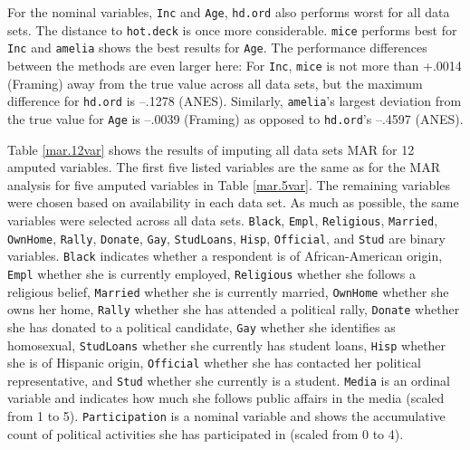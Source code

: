 \documentclass[12pt,econ]{sources/authesis}
\begin{document}
For the nominal variables, \texttt{Inc} and \texttt{Age}, \texttt{hd.ord} also performs worst for all data sets. The distance to \texttt{hot.deck} is once more considerable. \texttt{mice} performs best for \texttt{Inc} and \texttt{amelia} shows the best results for \texttt{Age}. The performance differences between the methods are even larger here: For \texttt{Inc}, \texttt{mice} is not more than +.0014 (Framing) away from the true value across all data sets, but the maximum difference for \texttt{hd.ord} is --.1278 (ANES). Similarly, \texttt{amelia}'s largest deviation from the true value for \texttt{Age} is --.0039 (Framing) as opposed to \texttt{hd.ord}'s --.4597 (ANES).

Table \ref{mar.12var} shows the results of imputing all data sets MAR for 12 amputed variables. The first five listed variables are the same as for the MAR analysis for five amputed variables in Table \ref{mar.5var}. The remaining variables were chosen based on availability in each data set. As much as possible, the same variables were selected across all data sets. \texttt{Black}, \texttt{Empl}, \texttt{Religious}, \texttt{Married}, \texttt{OwnHome}, \texttt{Rally}, \texttt{Donate}, \texttt{Gay}, \texttt{StudLoans}, \texttt{Hisp}, \texttt{Official}, and \texttt{Stud} are binary variables. \texttt{Black} indicates whether a respondent is of African-American origin, \texttt{Empl} whether she is currently employed, \texttt{Religious} whether she follows a religious belief, \texttt{Married} whether she is currently married, \texttt{OwnHome} whether she owns her home, \texttt{Rally} whether she has attended a political rally, \texttt{Donate} whether she has donated to a political candidate, \texttt{Gay} whether she identifies as homosexual, \texttt{StudLoans} whether she currently has student loans, \texttt{Hisp} whether she is of Hispanic origin, \texttt{Official} whether she has contacted her political representative, and \texttt{Stud} whether she currently is a student. \texttt{Media} is an ordinal variable and indicates how much she follows public affairs in the media (scaled from 1 to 5). \texttt{Participation} is a nominal variable and shows the accumulative count of political activities she has participated in (scaled from 0 to 4).

\ssp
\end{document}
